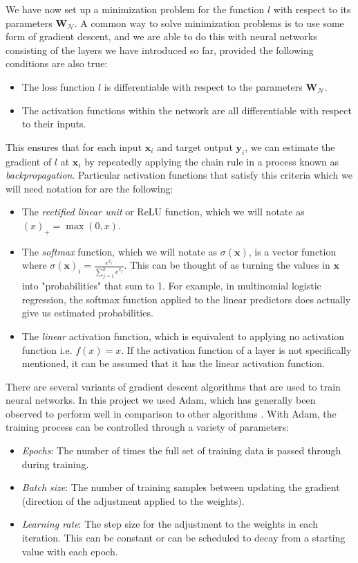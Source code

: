 \documentclass{somasmsc}
\begin{document}
We have now set up a minimization problem for the function $l$ with respect to its parameters $\mathbf{W}_{\mathcal{N}}$. A common way to solve minimization problems is to use some form of gradient descent, and we are able to do this with neural networks consisting of the layers we have introduced so far, provided the following conditions are also true:
\begin{itemize}
    \item The loss function $l$ is differentiable with respect to the parameters $\mathbf{W}_{\mathcal{N}}$.
    \item The activation functions within the network are all differentiable with respect to their inputs.
\end{itemize}
This ensures that for each input $\pmb{x}_i$ and target output $\pmb{y}_i$, we can estimate the gradient of $l$ at $\pmb{x}_i$ by repeatedly applying the chain rule in a process known as \textit{backpropagation}. Particular activation functions that satisfy this criteria which we will need notation for are the following:
\begin{itemize}
    \item The \textit{rectified linear unit} or ReLU function, which we will notate as $\left(x\right)_+ = \max{\left(0, x\right)}$.
    \item The \textit{softmax} function, which we will notate as $\sigma\left(\pmb{x}\right)$, is a vector function where $\sigma\left(\pmb{x}\right)_i = \frac{e^{x_i}}{\sum_{j=1}^k e^{x_j}}$. This can be thought of as turning the values in $\pmb{x}$ into "probabilities" that sum to 1. For example, in multinomial logistic regression, the softmax function applied to the linear predictors does actually give us estimated probabilities.
    \item The \textit{linear} activation function, which is equivalent to applying no activation function i.e. $f(x) = x$. If the activation function of a layer is not specifically mentioned, it can be assumed that it has the linear activation function.
\end{itemize}

There are several variants of gradient descent algorithms that are used to train neural networks. In this project we used Adam, which has generally been observed to perform well in comparison to other algorithms \citep{kingma2014adam}. With Adam, the training process can be controlled through a variety of parameters:
\begin{itemize}
    \item \textit{Epochs}: The number of times the full set of training data is passed through during training.
    \item \textit{Batch size}: The number of training samples between updating the gradient (direction of the adjustment applied to the weights).
    \item \textit{Learning rate}: The step size for the adjustment to the weights in each iteration. This can be constant or can be scheduled to decay from a starting value with each epoch.
\end{itemize}
\end{document}
